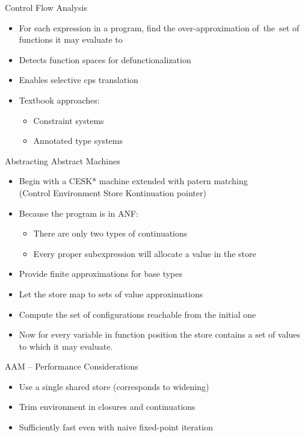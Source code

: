 \documentclass{beamer}
\begin{document}
\begin{frame}{Control Flow Analysis}
  \begin{itemize}
    \item For each expression in a program, find the over-approximation of~the~set of functions it may evaluate to
    \item Detects function spaces for defunctionalization
    \item Enables selective cps translation
    \pause
    \item Textbook approaches:
    \begin{itemize}
      \item Constraint systems
      \item Annotated type systems
    \end{itemize}
  \end{itemize}
\end{frame}

\begin{frame}{Abstracting Abstract Machines}
  \begin{itemize}
    \item Begin with a CESK* machine extended with patern matching\\
      (Control Environment Store Kontinuation pointer)\pause
    \item Because the program is in ANF:
    \begin{itemize}
      \item There are only two types of continuations
      \item Every proper subexpression will allocate a value in the store
    \end{itemize}\pause
    \item Provide finite approximations for base types
    \item Let the store map to sets of value approximations\pause
    \item Compute the set of configurations reachable from the initial one\pause
    \item Now for every variable in function position the store contains a set of values to which it may evaluate.
  \end{itemize}
\end{frame}

\begin{frame}{AAM -- Performance Considerations}
  \begin{itemize}
    \item Use a single shared store (corresponds to widening)\pause
    \item Trim environment in closures and continuations\pause
    \item Sufficiently fast even with naive fixed-point iteration
  \end{itemize}
\end{frame}
\end{document}
